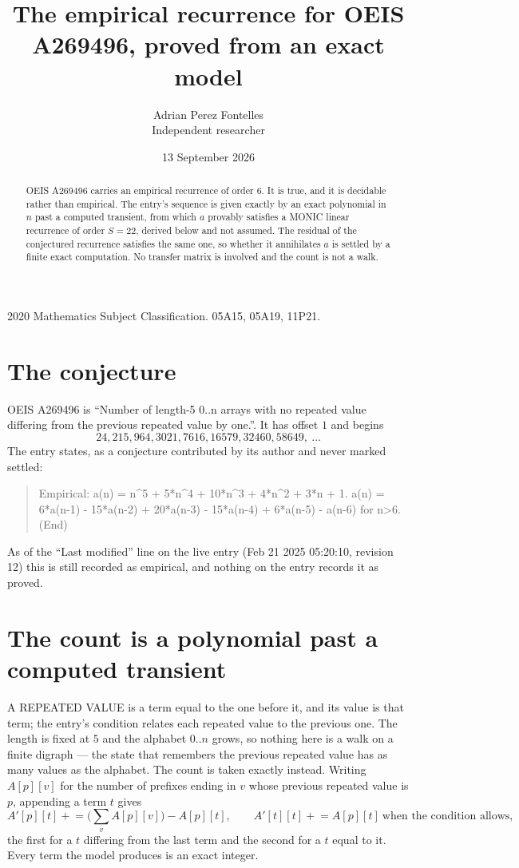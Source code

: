 \documentclass[11pt,a4paper]{article}
\title{The empirical recurrence for OEIS A269496, proved from an exact model}
\author{Adrian Perez Fontelles\\ \small Independent researcher}
\date{13 September 2026}
\theoremstyle{plain}
\theoremstyle{definition}
\begin{document}
\maketitle

\begin{abstract}
OEIS A269496 carries an empirical recurrence of order $6$. It is true, and it is
decidable rather than empirical. The entry's sequence is given exactly by an exact polynomial in $n$ past a computed transient, from
which $a$ provably satisfies a MONIC linear recurrence of order $S=22$, derived below and not
assumed. The residual of the conjectured recurrence satisfies the same one, so whether it
annihilates $a$ is settled by a finite exact computation. No transfer matrix is involved and
the count is not a walk.
\end{abstract}

\noindent\small 2020 Mathematics Subject Classification. 05A15, 05A19, 11P21.\normalsize

\section{The conjecture}

OEIS A269496 is ``Number of length-5 0..n arrays with no repeated value differing from the previous repeated value by one.''. It has offset $1$ and begins
\[
24, 215, 964, 3021, 7616, 16579, 32460, 58649,\ \dots
\]
The entry states, as a conjecture contributed by its author and never marked settled:
\begin{quote}
Empirical: a(n) = n\^{}5 + 5*n\^{}4 + 10*n\^{}3 + 4*n\^{}2 + 3*n + 1. a(n) = 6*a(n-1) - 15*a(n-2) + 20*a(n-3) - 15*a(n-4) + 6*a(n-5) - a(n-6) for n>6. (End)
\end{quote}
As of the ``Last modified'' line on the live entry (Feb 21 2025 05:20:10, revision 12)
this is still recorded as empirical, and nothing on the entry records it as proved.

\section{The count is a polynomial past a computed transient}

A REPEATED VALUE is a term equal to the one before it, and its value is that term; the entry's
condition relates each repeated value to the previous one. The length is fixed at $5$ and the
alphabet $0..n$ grows, so nothing here is a walk on a finite digraph --- the state that
remembers the previous repeated value has as many values as the alphabet. The count is taken
exactly instead. Writing $A[p][v]$ for the number of prefixes ending in $v$ whose previous
repeated value is $p$, appending a term $t$ gives
\[
A'[p][t] \mathrel{+}= \Big(\sum_v A[p][v]\Big) - A[p][t],
\qquad
A'[t][t] \mathrel{+}= A[p][t]\ \text{when the condition allows},
\]
the first for a $t$ differing from the last term and the second for a $t$ equal to it. Every
term the model produces is an exact integer.
\end{document}
